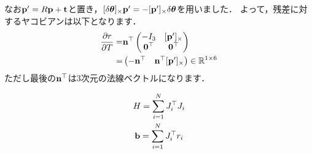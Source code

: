 %
なお${\bf p}' = R {\bf p} + {\bf t}$と置き，$[\delta \boldsymbol \theta]_{\times} {\bf p}' = -[{\bf p}']_{\times} \delta \boldsymbol \theta$を用いました．
よって，残差に対するヤコビアンは以下となります．
%
\begin{align}
  \begin{split}
    \frac{ \partial r }{ \partial T } = & {\bf n}^{\top} \left( \begin{matrix} -I_{3} & [{\bf p}']_{\times} \\ {\bf 0}^{\top} & {\bf 0}^{\top} \end{matrix} \right) \\
    = & \left( \begin{matrix} -{\bf n}^{\top} & {\bf n}^{\top} [{\bf p}']_{\times} \end{matrix} \right) \in \mathbb{R}^{1 \times 6}
  \end{split}
\end{align}
%
ただし最後の${\bf n}^{\top}$は3次元の法線ベクトルになります．

%
\begin{align}
  \begin{gathered}
    H = \sum_{i=1}^{N} J_{i}^{\top} J_{i} \\
    {\bf b} = \sum_{i=1}^{N} J_{i}^{\top} r_{i}
  \end{gathered}
\end{align}

